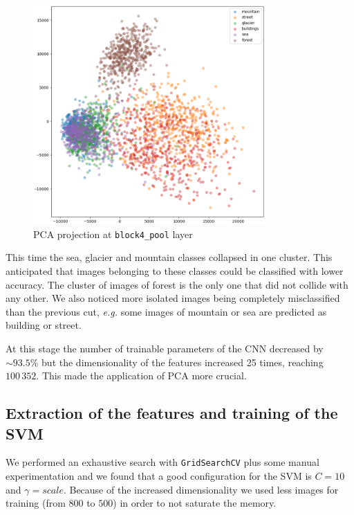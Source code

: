 \documentclass[compsoc]{IEEEtran}
\begin{document}
\begin{figure}[ht!]
\centering                                                                        
\includegraphics[width=3.5in]{../images/pca-2.png}
\captionsetup{justification=centering}                                                                                         
\caption{PCA projection at \texttt{block4\_pool} layer}
\label{fig:pca2}                                                                                                                               
\end{figure}

This time the sea, glacier and mountain classes collapsed in one cluster. This anticipated that images belonging to these classes could be classified with lower accuracy.
The cluster of images of forest is the only one that did not collide with any other.
We also noticed more isolated images being completely misclassified than the previous cut, \emph{e.g.} some images of mountain or sea are predicted as building or street.
\par



At this stage the number of trainable parameters of the CNN decreased by ${\sim93.5\%}$ but the dimensionality of the features increased 25 times, reaching $100\,352$. This made the application of PCA more crucial. 


\subsection{Extraction of the features and training of the SVM}
We performed an exhaustive search with \texttt{GridSearchCV} plus some manual experimentation and we found that a good configuration for the SVM is $C=10$ and $\gamma=scale$. Because of the increased dimensionality we used less images for training (from $800$ to $500$) in order to not saturate the memory. 	\par
\end{document}
